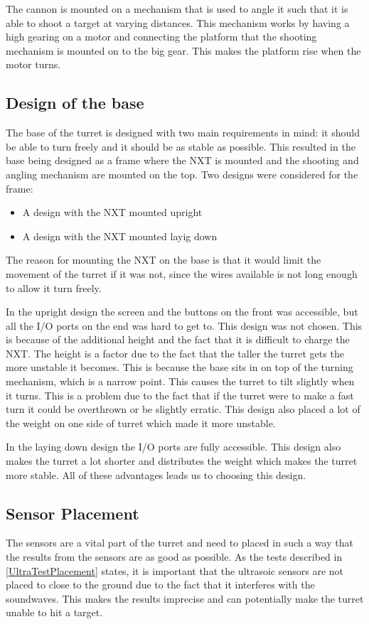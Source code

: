 The cannon is mounted on a mechanism that is used to angle it such that it
is able to shoot a target at varying distances. This mechanism works by having a
high gearing on a motor and connecting the platform that the shooting mechanism
is mounted on to the big gear. This makes the platform rise when the motor
turns.

\subsection{Design of the base}
The base of the turret is designed with two main requirements in mind: it should
be able to turn freely and it should be as stable as possible. This resulted
in the base being designed as a frame where the NXT is mounted and the shooting
and angling mechanism are mounted on the top. Two designs were considered for the frame: 

\begin{itemize}
  \item A design with the NXT mounted upright
  \item A design with the NXT mounted layig down
\end{itemize}

The reason for mounting the NXT on the base is that it would limit the movement
of the turret if it was not, since the wires available is not long enough to
allow it turn freely.\nl

In the upright design the screen and the buttons on the front
was accessible, but all the I/O ports on the end was hard to get to. This
design was not chosen. This is because of the additional height and the fact
that it is difficult to charge the NXT. The height is a factor due to the fact
that the taller the turret gets the more unstable it becomes. This is because
the base sits in on top of the turning mechanism, which is a narrow point. This
causes the turret to tilt slightly when it turns. This is a problem due to the
fact that if the turret were to make a fast turn it could be overthrown or be
slightly erratic. This design also placed a lot of the weight on one side of
turret which made it more unstable.\nl

In the laying down design the I/O ports are fully accessible. This design also makes the turret a
lot shorter and distributes the weight which makes the turret more stable. All
of these advantages leads us to choosing this design.

\subsection{Sensor Placement}
The sensors are a vital part of the turret and need to placed in such a way that
the results from the sensors are as good as possible. As the tests described in
\autoref{UltraTestPlacement} states, it is important that the ultrasoic sensors
are not placed to close to the ground due to the fact that it interferes with
the soundwaves. This makes the results imprecise and can potentially make the
turret unable to hit a target.\nl

